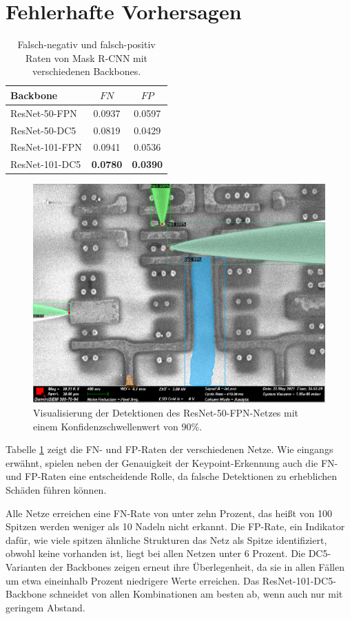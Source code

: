 \section{Fehlerhafte Vorhersagen}
\begin{table}[h]
\centering
\begin{tabular}{lcc}
\toprule
Backbone & $FN$ & $FP$ \\
\midrule
ResNet-50-FPN & 0.0937 & 0.0597 \\
ResNet-50-DC5 & 0.0819 & 0.0429 \\
ResNet-101-FPN & 0.0941 & 0.0536 \\
ResNet-101-DC5 & \textbf{0.0780} & \textbf{0.0390} \\
\bottomrule
\end{tabular}
\caption{Falsch-negativ und falsch-positiv Raten von Mask R-CNN mit verschiedenen Backbones.}
\label{tab:fnfp}
\end{table}
\begin{figure}[h]
    \centering
    \includegraphics[width=0.5\linewidth]{img/eval/images/r50-fpn-false.png}
    \caption{Visualisierung der Detektionen des ResNet-50-FPN-Netzes mit einem Konfidenzschwellenwert von 90\%.}
    \label{fig:falsepos}
\end{figure}
Tabelle \ref{tab:fnfp} zeigt die FN- und FP-Raten der verschiedenen Netze. Wie eingangs erwähnt, spielen neben der Genauigkeit der Keypoint-Erkennung auch die FN- und FP-Raten eine entscheidende Rolle, da falsche Detektionen zu erheblichen Schäden führen können.

Alle Netze erreichen eine FN-Rate von unter zehn Prozent, das heißt von 100 Spitzen werden weniger als 10 Nadeln nicht erkannt. Die FP-Rate, ein Indikator dafür, wie viele spitzen ähnliche Strukturen das Netz als Spitze identifiziert, obwohl keine vorhanden ist, liegt bei allen Netzen unter 6 Prozent.
Die DC5-Varianten der Backbones zeigen erneut ihre Überlegenheit, da sie in allen Fällen um etwa eineinhalb Prozent niedrigere Werte erreichen. Das ResNet-101-DC5-Backbone schneidet von allen Kombinationen am besten ab, wenn auch nur mit geringem Abstand.

